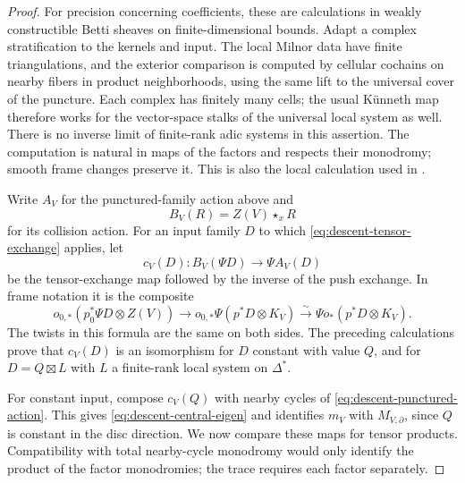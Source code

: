 \begin{proof}
For precision concerning coefficients, these are calculations in
weakly constructible Betti sheaves on finite-dimensional bounds.
Adapt a complex stratification to the kernels and input.  The local
Milnor data have finite triangulations, and the exterior comparison
is computed by cellular cochains on nearby fibers in product
neighborhoods, using the same lift to the universal cover of the
puncture.  Each complex has finitely many cells; the usual K\"unneth
map therefore works for the vector-space stalks of the universal
local system as well.  There is no inverse limit of finite-rank adic
systems in this assertion.  The computation is natural in maps of
the factors and respects their monodromy; smooth frame changes
preserve it.  This is also the local calculation used in
\cite[Proposition~6.3.1]{DT}.

Write $A_V$ for the punctured-family action above and
\[
 B_V(R)=Z(V)\star_x R
\]
for its collision action.  For an input family $D$ to which
\eqref{eq:descent-tensor-exchange} applies, let
\begin{equation}\label{eq:descent-c-map}
 c_V(D):B_V(\Psi D)\longrightarrow\Psi A_V(D)
\end{equation}
be the tensor-exchange map followed by the inverse of the push
exchange.  In frame notation it is the composite
\[
 o_{0,*}(p_0^*\Psi D\otimes Z(V))
 \longrightarrow o_{0,*}\Psi(p^*D\otimes K_V)
 \xrightarrow{\sim}\Psi o_*(p^*D\otimes K_V).
\]
The twists in this formula are the same on both sides.  The preceding
calculations prove that $c_V(D)$ is an isomorphism for $D$ constant
with value $Q$, and for $D=Q\boxtimes L$ with $L$ a finite-rank local
system on $\Delta^*$.

For constant input, compose $c_V(Q)$ with nearby cycles of
\eqref{eq:descent-punctured-action}.  This gives
\eqref{eq:descent-central-eigen} and identifies $m_V$ with
$M_{V,\partial}$, since $Q$ is constant in the disc direction.
We now compare these maps for tensor products.  Compatibility with
total nearby-cycle monodromy would only identify the product of the
factor monodromies; the trace requires each factor separately.


\end{proof}
